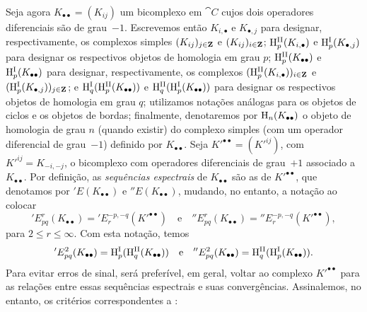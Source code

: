 \begin{env}[11.3.5]
\label{0.11.3.5}
Seja agora $K_{\bullet\bullet} = (K_{ij})$ um bicomplexo em $\cat{C}$ cujos dois operadores diferenciais são de grau~$-1$.
Escrevemos então $K_{i,\bullet}$ e $K_{\bullet,j}$ para designar, respectivamente, os complexos simples $(K_{ij})_{j\in\mathbf{Z}}$ e $(K_{ij})_{i\in\mathbf{Z}}$; $\mathrm{H}_{p}^\mathrm{II}(K_{i, \bullet})$ e $\mathrm{H}_{p}^\mathrm{I}(K_{\bullet, j})$ para designar os respectivos objetos de homologia em grau $p$; $\mathrm{H}_{p}^\mathrm{II}(K_{\bullet\bullet})$ e $\mathrm{H}_{p}^\mathrm{I}(K_{\bullet\bullet})$ para designar, respectivamente, os complexos $(\mathrm{H}_{p}^\mathrm{II}(K_{i, \bullet}))_{i \in\mathbf{Z}}$ e $(\mathrm{H}_{p}^\mathrm{I}(K_{\bullet, j}))_{j \in\mathbf{Z}}$; e $\mathrm{H}_q^\mathrm{I}(\mathrm{H}_{p}^\mathrm{II}(K_{\bullet\bullet}))$ e $\mathrm{H}_q^\mathrm{II}(\mathrm{H}_{p}^\mathrm{I}(K_{\bullet\bullet}))$ para designar os respectivos objetos de homologia em grau $q$;
utilizamos notações análogas para os objetos de ciclos e os objetos de bordas;
finalmente, denotaremos por $\mathrm{H}_n(K_{\bullet\bullet})$ o objeto de homologia de grau $n$ (quando existir) do complexo simples (com um operador diferencial de grau~$-1$) definido por $K_{\bullet\bullet}$.
Seja $K'^{\bullet\bullet}=(K'^{ij})$, com $K'^{ij}=K_{-i,-j}$, o bicomplexo com operadores diferenciais de grau~$+1$ associado a $K_{\bullet\bullet}$.
Por definição, as \emph{sequências espectrais} de $K_{\bullet\bullet}$ são as de $K'^{\bullet\bullet}$, que denotamos por $'E(K_{\bullet\bullet})$ e $''E(K_{\bullet\bullet})$, mudando, no entanto, a notação ao colocar
\[
  'E_{pq}^{r}(K_{\bullet\bullet})
  = 'E_{r}^{-p,-q}(K'^{\bullet\bullet})
  \quad\text{e}\quad
  ''E_{pq}^{r}(K_{\bullet\bullet})
  = ''E_{r}^{-p,-q}(K'^{\bullet\bullet}), 
\]
para $2\leq r \leq \infty$.
Com esta notação, temos
\[
  'E_{pq}^{2}(K_{\bullet\bullet})
  = \mathrm{H}_{p}^\mathrm{I}(\mathrm{H}_{q}^\mathrm{II}(K_{\bullet\bullet}))
  \quad\text{e}\quad
  ''E_{pq}^{2}(K_{\bullet\bullet})
  = \mathrm{H}_{q}^\mathrm{II}(\mathrm{H}_{p}^\mathrm{I}(K_{\bullet\bullet})).
\]
Para evitar erros de sinal, será preferível, em geral, voltar ao complexo $K'^{\bullet\bullet}$ para as relações entre essas sequências espectrais e suas convergências.
Assinalemos, no entanto, os critérios correspondentes a :
\end{env}

